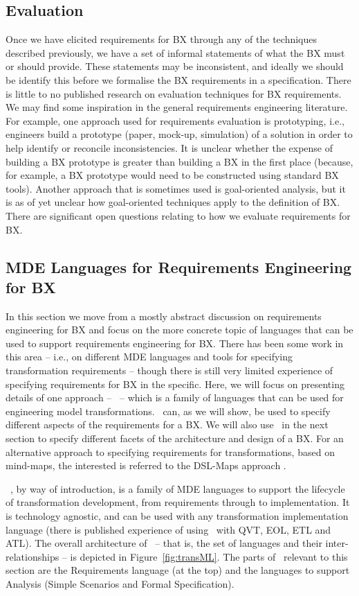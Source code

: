 \subsection{Evaluation}
Once we have elicited requirements for BX through any of the techniques described previously, we have a set of informal statements of what the BX must or should provide. These statements may be inconsistent, and ideally we should be identify this before we formalise the BX requirements in a specification. There is little to no published research on evaluation techniques for BX requirements. We may find some inspiration in the general requirements engineering literature. For example, one approach used for requirements evaluation is prototyping, i.e., engineers build a prototype (paper, mock-up, simulation) of a solution in order to help identify or reconcile inconsistencies. It is unclear whether the expense of building a BX prototype is greater than building a BX in the first place (because, for example, a BX prototype would need to be constructed using standard BX tools). Another approach that is sometimes used is goal-oriented analysis, but it is as of yet unclear  how goal-oriented techniques apply to the definition of BX. There are significant open questions relating to how we evaluate requirements for BX.

\subsection{MDE Languages for Requirements Engineering for BX}
In this section we move from a mostly abstract discussion on requirements engineering for BX and focus on the more concrete topic of languages that can be used to support requirements engineering for BX. There has been some work in this area -- i.e., on different MDE languages and tools for specifying transformation requirements -- though there is still very limited experience of specifying requirements for BX in the specific. Here, we will focus on presenting details of one approach -- \transml\ -- which is a family of languages that can be used for engineering model transformations. \transml\ can, as we will show, be used to specify different aspects of the requirements for a BX. We will also use \transml\ in the next section to specify different facets of the architecture and design of a BX. For an alternative approach to specifying requirements for transformations, based on mind-maps, the interested is referred to the DSL-Maps approach \cite{PescadorL16}.

\transml\ \cite{GuerraLKPS13}, by way of introduction, is a family of MDE languages to support the lifecycle of transformation development, from requirements through to implementation. It is technology agnostic, and can be used with any transformation implementation language (there is published experience of using \transml\ with QVT, EOL, ETL and ATL). The overall architecture of \transml\ -- that is, the set of languages and their inter-relationships -- is depicted in Figure~\ref{fig:transML}. The parts of \transml\ relevant to this section are the Requirements language (at the top) and the languages to support Analysis (Simple Scenarios and Formal Specification).

